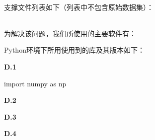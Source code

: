 \documentclass{MathorCupmodeling}
\begin{document}

\newpage
	~\\

	支撑文件列表如下（列表中不包含原始数据集）：

\newpage
	~\\

	为解决该问题，我们所使用的主要软件有：
	
	Python环境下所用使用到的库及其版本如下：

\newpage

\textbf{D.1 }
\begin{python}
import numpy as np
\end{python}
\newpage
\textbf{D.2 }

\newpage
\textbf{D.3 }

\newpage
\textbf{D.4 }
\end{document}
